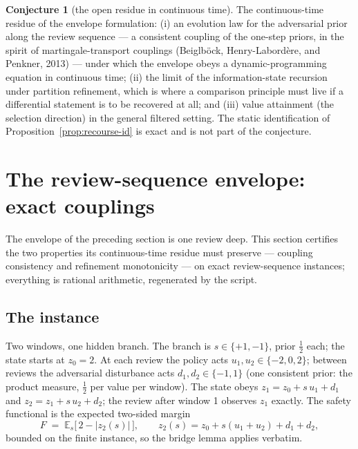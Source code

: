 \documentclass[10pt,twocolumn]{article}
\theoremstyle{definition}
\newtheorem{conjecture}{Conjecture}
\begin{document}
\begin{conjecture}[the open residue in continuous time]\label{conj:envelope}
The continuous-time residue of the envelope formulation: (i) an evolution
law for the adversarial prior along the review sequence --- a consistent
coupling of the one-step priors, in the spirit of martingale-transport
couplings (Beiglb\"ock, Henry-Labord\`ere, and Penkner, 2013) --- under which the envelope obeys a dynamic-programming equation
in continuous time; (ii) the limit of the information-state recursion under
partition refinement, which is where a comparison principle must live if a
differential statement is to be recovered at all; and (iii) value
attainment (the selection direction) in the general filtered setting. The
static identification of Proposition~\ref{prop:recourse-id} is exact and is
not part of the conjecture.
\end{conjecture}

\section{The review-sequence envelope: exact couplings}

The envelope of the preceding section is one review deep. This section certifies
the two properties its continuous-time residue must preserve --- coupling
consistency and refinement monotonicity --- on exact review-sequence
instances; everything is rational arithmetic, regenerated by the script.

\subsection{The instance}

Two windows, one hidden branch. The branch is $s \in \{+1, -1\}$, prior
$\tfrac{1}{2}$ each; the state starts at $z_0 = 2$. At each review the
policy acts $u_1, u_2 \in \{-2, 0, 2\}$; between reviews the adversarial
disturbance acts $d_1, d_2 \in \{-1, 1\}$ (one consistent prior: the
product measure, $\tfrac{1}{2}$ per value per window). The state obeys
$z_1 = z_0 + s\, u_1 + d_1$ and $z_2 = z_1 + s\, u_2 + d_2$; the review
after window 1 observes $z_1$ exactly. The safety functional is the
expected two-sided margin
\[
F \;=\; \mathbb{E}_{s}\bigl[\, 2 - |z_{2}(s)| \,\bigr],
\qquad z_{2}(s) = z_0 + s(u_1 + u_2) + d_1 + d_2,
\]
bounded on the finite instance, so the bridge lemma applies verbatim.
\end{document}
